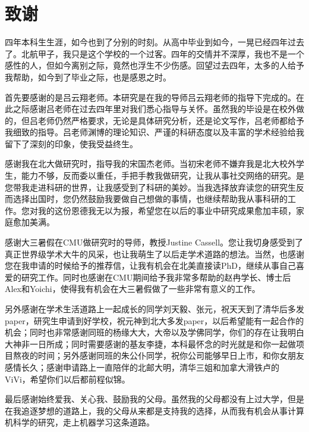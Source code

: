\chapter*{致谢}

\qquad 四年本科生生涯，如今也到了分别的时刻。从高中毕业到如今，一晃已经四年过去了。北航甲子，我只是这个学校的一个过客。四年的交情并不深厚，我也不是一个感性的人，但如今离别之际，竟然也浮生不少伤感。回望过去四年，太多的人给予我帮助，如今到了毕业之际，也是感恩之时。

首先要感谢的是吕云翔老师。本研究是在我的导师吕云翔老师的指导下完成的。在此之际感谢吕老师在过去四年里对我们悉心指导与关怀。虽然我的毕设是在校外做的，但吕老师仍然严格要求，无论是具体研究分析，还是论文写作，吕老师都给予我细致的指导。吕老师渊博的理论知识、严谨的科研态度以及丰富的学术经验给我留下了深刻的印象，使我受益终生。

感谢我在北大做研究时，指导我的宋国杰老师。当初宋老师不嫌弃我是北大校外学生，能力不够，反而委以重任，手把手教我做研究，让我从事社交网络的研究。是您带我走进科研的世界，让我感受到了科研的美妙。当我选择放弃读您的研究生反而选择出国时，您仍然鼓励我要做自己想做的事情，也继续帮助我从事科研的工作。您对我的这份恩德我无以为报，希望您在以后的事业中研究成果愈加丰硕，家庭愈加美满。

感谢大三暑假在CMU做研究时的导师，教授Justine Cassell。您让我切身感受到了真正世界级学术大牛的风采，也让我萌生了以后走学术道路的想法。当然，也感谢您在我申请的时候给予的推荐信，让我有机会在北美直接读PhD，继续从事自己喜爱的研究工作。同时也感谢在CMU期间给予我非常多帮助的赵冉学长、博士后Alex和Yoichi，使得我有机会在大三暑假做了一些非常有意义的工作。


另外感谢在学术生活道路上一起成长的同学刘天毅、张元，祝天天到了清华后多发paper，研究生申请到好学校，祝元神到北大多发paper，以后希望能有一起合作的机会；同时也非常感谢同班的杨缘大大，大帝以及学佛同学，你们的存在让我明白大神非一日所成；同时需要感谢的基友李捷，本科最怀念的时光就是和你一起做项目熬夜的时间；另外感谢同班的朱公仆同学，祝你公司能够早日上市，和你女朋友感情长久；感谢申请路上一直陪伴的北邮大明，清华三姐和加拿大滑铁卢的ViVi，希望你们以后都前程似锦。


最后感谢始终爱我、关心我、鼓励我的父母。虽然我的父母都没有上过大学，但是在我追逐梦想的道路上，我的父母从来都是支持我的选择，从而我有机会从事计算机科学的研究，走上机器学习这条道路。


















\cleardoublepage
